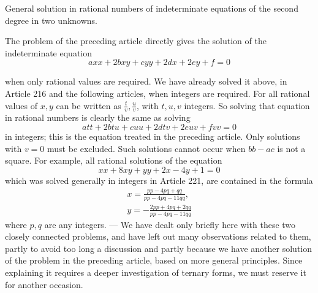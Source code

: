\begin{center}General solution in rational numbers of indeterminate equations of the second degree in two unknowns.\end{center}


The problem of the preceding article directly gives the solution of the indeterminate equation
\[axx+2bxy+cyy+2dx+2ey+f=0\]

when only rational values are required. We have already solved it above, in Article 216 and the following articles, when integers are required. For all rational values of \(x,y\) can be written as \(\frac{t}{v},\frac{u}{v}\), with \(t,u,v\) integers. So solving that equation in rational numbers is clearly the same as solving
\[att+2btu+cuu+2dtv+2euv+fvv=0\]
in integers; this is the equation treated in the preceding article. Only solutions with \(v=0\) must be excluded. Such solutions cannot occur when \(bb-ac\) is not a square. For example, all rational solutions of the equation
\[xx+8xy+yy+2x-4y+1=0\]
which was solved generally in integers in Article 221, are contained in the formula
\[\begin{gathered}x=\frac{pp-4pq+qq}{pp-4pq-11qq},\\ y=-\frac{2pp+4pq+2qq}{pp-4pq-11qq}\end{gathered}\]
where \(p,q\) are any integers. — We have dealt only briefly here with these two closely connected problems, and have left out many observations related to them, partly to avoid too long a discussion and partly because we have another solution of the problem in the preceding article, based on more general principles. Since explaining it requires a deeper investigation of ternary forms, we must reserve it for another occasion.
